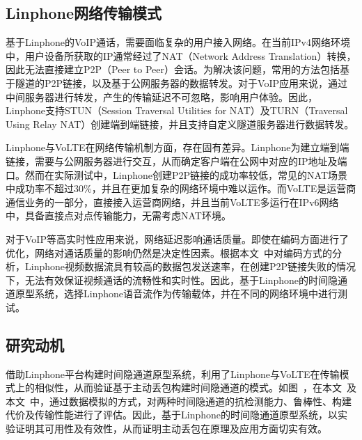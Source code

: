 \subsection{Linphone网络传输模式}
\label{chap:linphone:motivation:net}

基于Linphone的VoIP通话，需要面临复杂的用户接入网络。在当前IPv4网络环境中，用户设备所获取的IP通常经过了NAT（Network Address Translation）转换，因此无法直接建立P2P（Peer to Peer）会话。为解决该问题，常用的方法包括基于隧道的P2P链接，以及基于公网服务器的数据转发。对于VoIP应用来说，通过中间服务器进行转发，产生的传输延迟不可忽略，影响用户体验。因此，Linphone支持STUN（Session Traversal Utilities for NAT）及TURN（Traversal Using Relay NAT）创建端到端链接，并且支持自定义隧道服务器进行数据转发。

Linphone与VoLTE在网络传输机制方面，存在固有差异。Linphone为建立端到端链接，需要与公网服务器进行交互，从而确定客户端在公网中对应的IP地址及端口。然而在实际测试中，Linphone创建P2P链接的成功率较低，常见的NAT场景中成功率不超过30\%，并且在更加复杂的网络环境中难以运作。而VoLTE是运营商通信业务的一部分，直接接入运营商网络，并且当前VoLTE多运行在IPv6网络中，具备直接点对点传输能力，无需考虑NAT环境。

对于VoIP等高实时性应用来说，网络延迟影响通话质量。即使在编码方面进行了优化，网络对通话质量的影响仍然是决定性因素。根据本文\ 中对编码方式的分析，Linphone视频数据流具有较高的数据包发送速率，在创建P2P链接失败的情况下，无法有效保证视频通话的流畅性和实时性。因此，基于Linphone的时间隐通道原型系统，选择Linphone语音流作为传输载体，并在不同的网络环境中进行测试。

\subsection{研究动机}
\label{chap:linphone:motivation:sum}


借助Linphone平台构建时间隐通道原型系统，利用了Linphone与VoLTE在传输模式上的相似性，从而验证基于主动丢包构建时间隐通道的模式。如图\ ，在本文\ 及本文\ 中，通过数据模拟的方式，对两种时间隐通道的抗检测能力、鲁棒性、构建代价及传输性能进行了评估。因此，基于Linphone的时间隐通道原型系统，以实验证明其可用性及有效性，从而证明主动丢包在原理及应用方面切实有效。